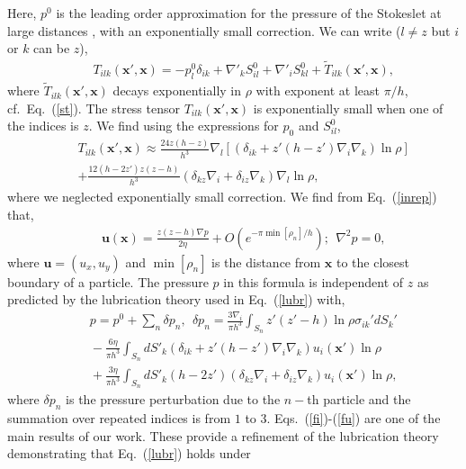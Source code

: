 Here, $p^0$ is the leading order approximation for the pressure of the Stokeslet at large distances \citep{LironMochon}, with an exponentially small correction.
We can write ($l\neq z$ but $i$ or $k$ can be  $z$),
\begin{eqnarray}&&\!\!\!\!\!\!\!\!\!\!
T_{ilk}(\bm x', \bm x)=-p^0_l\delta_{ik}+\nabla'_k S^0_{il}+\nabla'_i S^0_{kl}\!+\!{\tilde T}_{ilk}(\bm x', \bm x),
\end{eqnarray}
where ${\tilde T}_{ilk}(\bm x', \bm x)$ decays exponentially in $\rho$ with exponent at least $\pi/h$, cf.\ Eq.~(\ref{st}). The stress tensor $T_{ilk}(\bm x', \bm x)$
is exponentially small when one of the indices is $z$.
We find using the expressions for $p_0$ and $S^0_{il}$,
\begin{eqnarray}&&
T_{ilk}(\bm x', \bm x)\approx \frac{24z(h-z)}{h^3}\nabla_l\left[ \left(\delta_{ik}+z'(h\!-\!z')\nabla_i \nabla_k \right)\ln \rho\right]\nonumber\\&&
+\frac{12 (h\!-\!2z')z(z\!-\!h)}{h^3}\left(\delta_{kz}\nabla_i+\delta_{iz}\nabla_k \right) \nabla_l\ln \rho,
\end{eqnarray}
where we neglected exponentially small correction. We find from Eq.~(\ref{inrep}) that,
\begin{eqnarray}&&\!\!\!\!\!\!\!\!\!\!
\bm u(\bm x)\!=\!\frac{z(z\!-\!h)\nabla p}{2\eta}+O\left(e^{-\pi\min[\rho_n]/h}\right)\!;\ \ \nabla^2 p\!=\!0,\label{fi}
\end{eqnarray}
where  
$\bm u=(u_x, u_y)$ and $\min[\rho_n]$ is the distance from $\bm x$ to the closest boundary of a particle. 
The pressure $p$ in this formula is independent of $z$ as predicted by the lubrication theory used in Eq.~(\ref{lubr}) with,
\begin{eqnarray}&&\!\!\!\!\!\!
p=p^0+\sum_n \delta p_n,\ \ \delta p_n=\frac{3\nabla_i}{\pi h^3}\int_{S_n}z'(z'-h) \ln \rho \sigma_{ik}'dS_k'\nonumber
\\&&\!\!\!\!\!\!
-\frac{6\eta}{\pi h^3} \int_{S_n} dS'_k  \left(\delta_{ik}+z'(h\!-\!z')\nabla_i \nabla_k \right) u_{i}(\bm x') \ln \rho\nonumber\\&&\!\!\!\!\!\!
+\frac{3\eta}{\pi h^3} \int_{S_n} dS'_k  (h\!-\!2z')\left(\delta_{kz}\nabla_i+\delta_{iz}\nabla_k \right) u_{i}(\bm x') \ln \rho,\label{fu}
\end{eqnarray}
where $\delta p_n$ is the pressure perturbation due to the $n-$th particle and the summation over repeated indices is from $1$ to $3$. Eqs.~(\ref{fi})-(\ref{fu}) are one of the main results of our work. These provide a refinement of the lubrication theory demonstrating that Eq.~(\ref{lubr}) holds under
